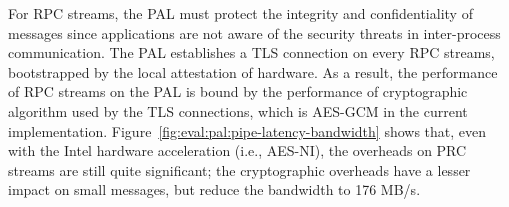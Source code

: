 For RPC streams,
the \sgx{} PAL must protect the integrity and confidentiality of messages since applications
are not aware of the security threats in inter-process communication.
The \sgx{} PAL establishes a TLS connection
on every RPC streams,
bootstrapped by the local attestation of \sgx{} hardware.
As a result,
the performance of RPC streams on the \sgx{} PAL
is bound by the performance
of cryptographic algorithm used by the TLS connections,
which is AES-GCM in the current implementation.
Figure~\ref{fig:eval:pal:pipe-latency-bandwidth}
shows that, even with the Intel hardware acceleration (i.e., AES-NI),
the overheads on PRC streams are still
quite significant;
the cryptographic overheads have a lesser impact on small messages,
but reduce the bandwidth
to \roughly{}176 MB/s.







